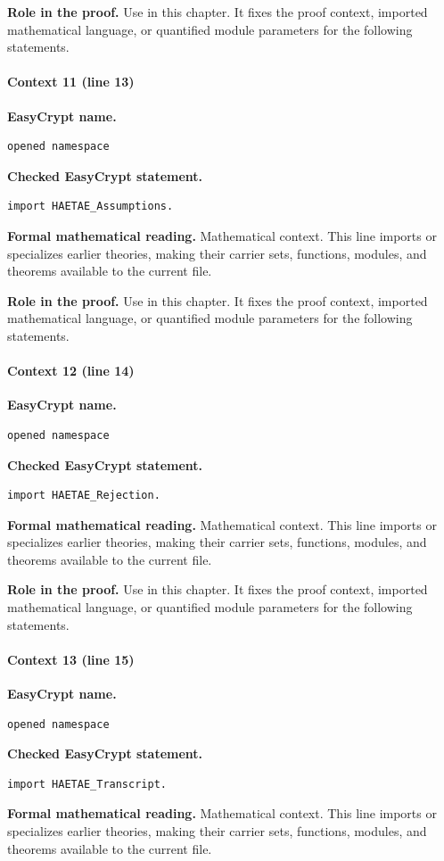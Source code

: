 \noindent\textbf{Role in the proof.}
Use in this chapter. It fixes the proof context, imported mathematical language, or quantified module parameters for the following statements.

\paragraph{Context 11 (line 13)}
\noindent\textbf{EasyCrypt name.}
\begin{lstlisting}[language=EasyCrypt,basicstyle=\ttfamily\scriptsize]
opened namespace
\end{lstlisting}
\noindent\textbf{Checked EasyCrypt statement.}
\begin{lstlisting}[language=EasyCrypt,basicstyle=\ttfamily\scriptsize]
import HAETAE_Assumptions.
\end{lstlisting}
\noindent\textbf{Formal mathematical reading.}
Mathematical context. This line imports or specializes earlier theories, making their carrier sets, functions, modules, and theorems available to the current file.

\noindent\textbf{Role in the proof.}
Use in this chapter. It fixes the proof context, imported mathematical language, or quantified module parameters for the following statements.

\paragraph{Context 12 (line 14)}
\noindent\textbf{EasyCrypt name.}
\begin{lstlisting}[language=EasyCrypt,basicstyle=\ttfamily\scriptsize]
opened namespace
\end{lstlisting}
\noindent\textbf{Checked EasyCrypt statement.}
\begin{lstlisting}[language=EasyCrypt,basicstyle=\ttfamily\scriptsize]
import HAETAE_Rejection.
\end{lstlisting}
\noindent\textbf{Formal mathematical reading.}
Mathematical context. This line imports or specializes earlier theories, making their carrier sets, functions, modules, and theorems available to the current file.

\noindent\textbf{Role in the proof.}
Use in this chapter. It fixes the proof context, imported mathematical language, or quantified module parameters for the following statements.

\paragraph{Context 13 (line 15)}
\noindent\textbf{EasyCrypt name.}
\begin{lstlisting}[language=EasyCrypt,basicstyle=\ttfamily\scriptsize]
opened namespace
\end{lstlisting}
\noindent\textbf{Checked EasyCrypt statement.}
\begin{lstlisting}[language=EasyCrypt,basicstyle=\ttfamily\scriptsize]
import HAETAE_Transcript.
\end{lstlisting}
\noindent\textbf{Formal mathematical reading.}
Mathematical context. This line imports or specializes earlier theories, making their carrier sets, functions, modules, and theorems available to the current file.

